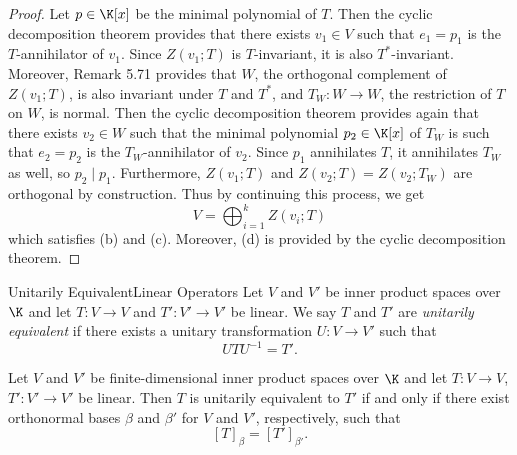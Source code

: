 \documentclass[linearalgebraII]{subfiles}
\begin{document}
    \begin{proof}
        Let $p\in\K[x]$ be the minimal polynomial of $T$. Then the cyclic decomposition theorem provides that there exists $v_1\in V$ such that $e_1=p_1$ is the $T$-annihilator of $v_1$. Since $Z\left( v_1;T \right)$ is $T$-invariant, it is also $T^{*} $-invariant. Moreover, Remark 5.71 provides that $W$, the orthogonal complement of $Z\left( v_1;T \right)$, is also invariant under $T$ and $T^{*}$, and $T_W:W\to W$, the restriction of $T$ on $W$, is normal. Then the cyclic decomposition theorem provides again that there exists $v_2\in W$ such that the minimal polynomial $p_2\in\K[x]$ of $T_W$ is such that $e_2=p_2$ is the $T_W$-annihilator of $v_2$. Since $p_1$ annihilates $T$, it annihilates $T_W$ as well, so $p_2\mid p_1$. Furthermore, $Z\left( v_1;T \right)$ and $Z\left( v_2;T \right) = Z\left( v_2;T_W \right)$ are orthogonal by construction. Thus by continuing this process, we get
        \begin{equation*}
            V = \bigoplus^{k}_{i=1} Z\left( v_i;T \right)
        \end{equation*}
        which satisfies (b) and (c). Moreover, (d) is provided by the cyclic decomposition theorem.
    \end{proof}

    \begin{definition}{Unitarily Equivalent}{Linear Operators}
        Let $V$ and $V'$ be inner product spaces over $\K$ and let $T:V\to V$ and $T':V'\to V'$ be linear. We say $T$ and $T'$ are \emph{unitarily equivalent} if there exists a unitary transformation $U:V\to V'$ such that
        \begin{equation*}
            UTU^{-1} = T'.
        \end{equation*}
    \end{definition}

    \clearpage
    \begin{prop}{}
        Let $V$ and $V'$ be finite-dimensional inner product spaces over $\K$ and let $T:V\to V$, $T':V'\to V'$ be linear. Then $T$ is unitarily equivalent to $T'$ if and only if there exist orthonormal bases $\beta$ and $\beta'$ for $V$ and $V'$, respectively, such that
        \begin{equation*}
            \left[ T \right] _\beta = \left[ T' \right] _{\beta'}.
        \end{equation*}
    \end{prop}
\end{document}
